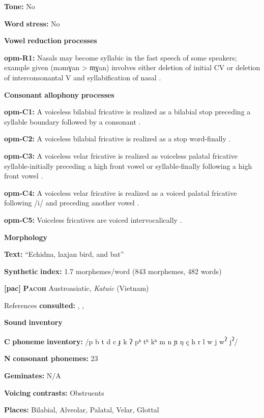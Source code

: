 \begin{styleBody}
\textbf{Tone:} No

\textbf{Word} \textbf{stress:} No

\textbf{Vowel} \textbf{reduction} \textbf{processes}

\textbf{opm-R1:} Nasals may become syllabic in the fast speech of some speakers; example given (məmɣan > m̩ɣan) involves either deletion of initial CV or deletion of interconsonantal V and syllabification of nasal \citep[64]{Loughnane2009}.

\textbf{Consonant} \textbf{allophony} \textbf{processes}

\textbf{opm-C1:} A voiceless bilabial fricative is realized as a bilabial stop preceding a syllable boundary followed by a consonant \citep[33]{Loughnane2009}.

\textbf{opm-C2:} A voiceless bilabial fricative is realized as a stop word-finally \citep[33]{Loughnane2009}.

\textbf{opm-C3:} A voiceless velar fricative is realized as voiceless palatal fricative syllable-initially preceding a high front vowel or syllable-finally following a high front vowel \citep[42]{Loughnane2009}.

\textbf{opm-C4:} A voiceless velar fricative is realized as a voiced palatal fricative following /i/ and preceding another vowel \citep[42]{Loughnane2009}.

\textbf{opm-C5:} Voiceless fricatives are voiced intervocalically \citep[42]{Loughnane2009}.

\textbf{Morphology}

\textbf{Text:} “Echidna, laxjan bird, and bat” \citep[493-502]{Loughnane2009}

\textbf{Synthetic} \textbf{index:} 1.7 morphemes/word (843 morphemes, 482 words)

\textbf{[pac]}   \textbf{\textsc{Pacoh}}  Austroasiatic, \textit{Katuic} (Vietnam)

References \textbf{consulted:} \citet{Alves2000}, \citet{Alves2006}, \citet{Watson1980}

\textbf{Sound} \textbf{inventory}

\textbf{C} \textbf{phoneme} \textbf{inventory:} /p b t d c ɟ k ʔ pʰ tʰ kʰ m n ɲ ŋ ç h r l w j w\textsuperscript{ʔ} j\textsuperscript{ʔ}/

\textbf{N} \textbf{consonant} \textbf{phonemes:} 23

\textbf{Geminates:} N/A

\textbf{Voicing} \textbf{contrasts:} Obstruents

\textbf{Places:} Bilabial, Alveolar, Palatal, Velar, Glottal


\end{styleBody}
